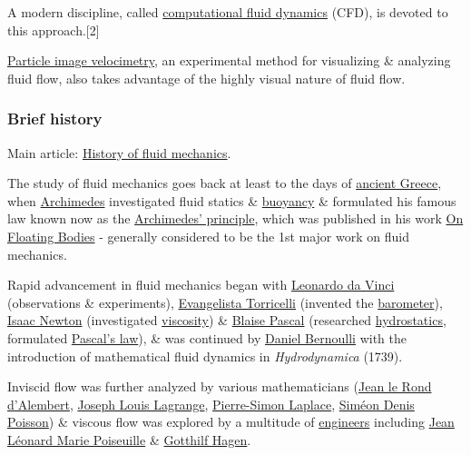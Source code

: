 \documentclass{article}
\begin{document}
A modern discipline, called \href{https://en.wikipedia.org/wiki/Computational_fluid_dynamics}{computational fluid dynamics} (CFD), is devoted to this approach.[2]

\href{https://en.wikipedia.org/wiki/Particle_image_velocimetry}{Particle image velocimetry}, an experimental method for visualizing \& analyzing fluid flow, also takes advantage of the highly visual nature of fluid flow.

\subsubsection{Brief history}
Main article: \href{https://en.wikipedia.org/wiki/History_of_fluid_mechanics}{History of fluid mechanics}.

%
The study of fluid mechanics goes back at least to the days of \href{https://en.wikipedia.org/wiki/Ancient_Greece}{ancient Greece}, when \href{https://en.wikipedia.org/wiki/Archimedes}{Archimedes} investigated fluid statics \& \href{https://en.wikipedia.org/wiki/Buoyancy}{buoyancy} \& formulated his famous law known now as the \href{https://en.wikipedia.org/wiki/Archimedes'_principle}{Archimedes' principle}, which was published in his work \href{https://en.wikipedia.org/wiki/On_Floating_Bodies}{On Floating Bodies} - generally considered to be the 1st major work on fluid mechanics.

Rapid advancement in fluid mechanics began with \href{https://en.wikipedia.org/wiki/Leonardo_da_Vinci}{Leonardo da Vinci} (observations \& experiments), \href{https://en.wikipedia.org/wiki/Evangelista_Torricelli}{Evangelista Torricelli} (invented the \href{https://en.wikipedia.org/wiki/Barometer}{barometer}), \href{https://en.wikipedia.org/wiki/Isaac_Newton}{Isaac Newton} (investigated \href{https://en.wikipedia.org/wiki/Viscosity}{viscosity}) \& \href{https://en.wikipedia.org/wiki/Blaise_Pascal}{Blaise Pascal} (researched \href{https://en.wikipedia.org/wiki/Hydrostatics}{hydrostatics}, formulated \href{https://en.wikipedia.org/wiki/Pascal's_law}{Pascal's law}), \& was continued by \href{https://en.wikipedia.org/wiki/Daniel_Bernoulli}{Daniel Bernoulli} with the introduction of mathematical fluid dynamics in \textit{Hydrodynamica} (1739).

%
Inviscid flow was further analyzed by various mathematicians (\href{https://en.wikipedia.org/wiki/Jean_le_Rond_d'Alembert}{Jean le Rond d'Alembert}, \href{https://en.wikipedia.org/wiki/Joseph_Louis_Lagrange}{Joseph Louis Lagrange}, \href{https://en.wikipedia.org/wiki/Pierre-Simon_Laplace}{Pierre-Simon Laplace}, \href{https://en.wikipedia.org/wiki/Sim%C3%A9on_Denis_Poisson}{Siméon Denis Poisson}) \& viscous flow was explored by a multitude of \href{https://en.wikipedia.org/wiki/Engineers}{engineers} including \href{https://en.wikipedia.org/wiki/Jean_L%C3%A9onard_Marie_Poiseuille}{Jean Léonard Marie Poiseuille} \& \href{https://en.wikipedia.org/wiki/Gotthilf_Hagen}{Gotthilf Hagen}.
\end{document}
